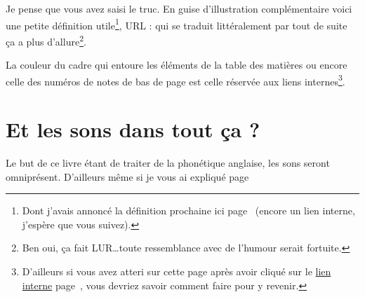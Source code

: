 Je pense que vous avez saisi le truc. En guise d'illustration
complémentaire voici une petite définition utile\footnote{Dont j'avais
annoncé la définition prochaine ici page~\pageref{sec:link} (encore un
lien interne, j'espère que vous suivez).}, URL :  qui se traduit littéralement par
 tout de suite ça a plus
d'allure\footnote{Ben oui, ça fait LUR\dots toute ressemblance avec de
  l'humour serait fortuite.}.

La couleur du cadre qui entoure les éléments de la table des matières
ou encore celle des numéros de notes de bas de page est celle réservée
aux \hypertarget{linkin}{liens internes}\footnote{D'ailleurs si vous
  avez atteri sur cette page après avoir cliqué sur le
  \hyperlink{retour}{lien interne} page~\pageref{retour}, vous devriez
savoir comment faire pour y revenir.}. 

\newpage

\section{Et les sons dans tout ça ?}\label{sec:phonetics}

Le but de ce livre étant de traiter de la phonétique anglaise, les
sons seront omniprésent. D'ailleurs même si je vous ai expliqué page~\pageref{sec:side}

\newpage
\minitoc

